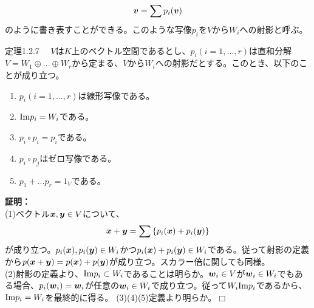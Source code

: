 \documentclass[dvipdfmx, 9pt, a4paper]{jsarticle}
\numberwithin{equation}{subsection}
\newcommand{\bm}[1]{{\mbox{\boldmath $#1$}}}
\def\qed{\hfill $\Box$}
\begin{document}
\begin{equation}
\bm v=\sum p_i(\bm v) \notag
\end{equation}
のように書き表すことができる。このような写像$p_i$を$V$から$W_i$への射影と呼ぶ。
\begin{itembox}[l]{定理1.2.7}
　$V$は$K$上のベクトル空間であるとし、$p_i(i=1, ..., r)$は直和分解$V=W_1 \oplus ... \oplus W_r$から定まる、$V$から$W_i$への射影だとする。このとき、以下のことが成り立つ。
\begin{enumerate}
\item $p_i(i=1, ..., r)$は線形写像である。
\item ${\rm Im}p_i=W_i$である。
\item $p_i \circ p_i=p_i$である。
\item $p_i \circ p_j$はゼロ写像である。
\item $p_1+...p_r=1_V$である。
\end{enumerate}
\end{itembox}
{\bf 証明：}\\
(1)ベクトル$\bm x, \bm y \in V$について、
\begin{equation}
\bm x+\bm y=\sum \left\{p_i(\bm x)+p_i(\bm y)\right\} \notag
\end{equation}
が成り立つ。$p_i(\bm x),p_i(\bm y) \in W_i$かつ$p_i(\bm x)+p_i(\bm y) \in W_i$である。従って射影の定義から$p(\bm x+\bm y)=p(\bm x)+p(\bm y)$が成り立つ。スカラー倍に関しても同様。\\
(2)射影の定義より、${\rm Im}p_i \subset W_i$であることは明らか。$\bm w_i \in V$が$\bm w_i \in W_i$でもある場合、$p_i(\bm w_i)=\bm w_i$が任意の$\bm w_i \in W_i$で成り立つ。従って$W_i {\rm Im}p_i$であるから、${\rm Im}p_i=W_i$を最終的に得る。
(3)(4)(5)定義より明らか。\qed
\end{document}
